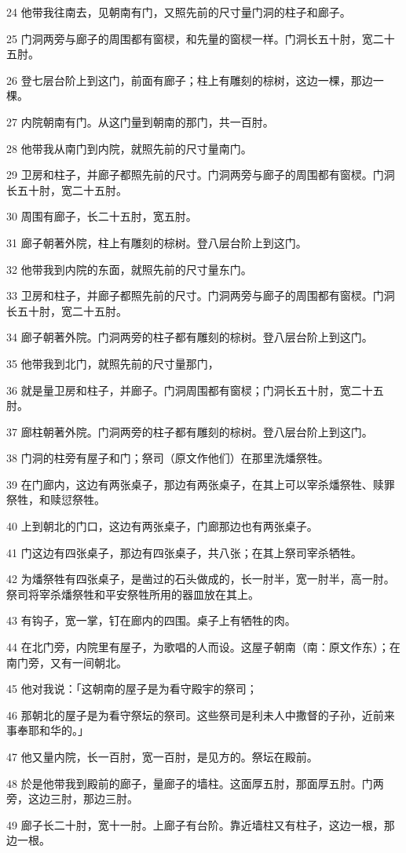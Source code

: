 \par 24 他带我往南去，见朝南有门，又照先前的尺寸量门洞的柱子和廊子。
\par 25 门洞两旁与廊子的周围都有窗棂，和先量的窗棂一样。门洞长五十肘，宽二十五肘。
\par 26 登七层台阶上到这门，前面有廊子；柱上有雕刻的棕树，这边一棵，那边一棵。
\par 27 内院朝南有门。从这门量到朝南的那门，共一百肘。
\par 28 他带我从南门到内院，就照先前的尺寸量南门。
\par 29 卫房和柱子，并廊子都照先前的尺寸。门洞两旁与廊子的周围都有窗棂。门洞长五十肘，宽二十五肘。
\par 30 周围有廊子，长二十五肘，宽五肘。
\par 31 廊子朝著外院，柱上有雕刻的棕树。登八层台阶上到这门。
\par 32 他带我到内院的东面，就照先前的尺寸量东门。
\par 33 卫房和柱子，并廊子都照先前的尺寸。门洞两旁与廊子的周围都有窗棂。门洞长五十肘，宽二十五肘。
\par 34 廊子朝著外院。门洞两旁的柱子都有雕刻的棕树。登八层台阶上到这门。
\par 35 他带我到北门，就照先前的尺寸量那门，
\par 36 就是量卫房和柱子，并廊子。门洞周围都有窗棂；门洞长五十肘，宽二十五肘。
\par 37 廊柱朝著外院。门洞两旁的柱子都有雕刻的棕树。登八层台阶上到这门。
\par 38 门洞的柱旁有屋子和门；祭司（原文作他们）在那里洗燔祭牲。
\par 39 在门廊内，这边有两张桌子，那边有两张桌子，在其上可以宰杀燔祭牲、赎罪祭牲，和赎愆祭牲。
\par 40 上到朝北的门口，这边有两张桌子，门廊那边也有两张桌子。
\par 41 门这边有四张桌子，那边有四张桌子，共八张；在其上祭司宰杀牺牲。
\par 42 为燔祭牲有四张桌子，是凿过的石头做成的，长一肘半，宽一肘半，高一肘。祭司将宰杀燔祭牲和平安祭牲所用的器皿放在其上。
\par 43 有钩子，宽一掌，钉在廊内的四围。桌子上有牺牲的肉。
\par 44 在北门旁，内院里有屋子，为歌唱的人而设。这屋子朝南（南：原文作东）；在南门旁，又有一间朝北。
\par 45 他对我说：「这朝南的屋子是为看守殿宇的祭司；
\par 46 那朝北的屋子是为看守祭坛的祭司。这些祭司是利未人中撒督的子孙，近前来事奉耶和华的。」
\par 47 他又量内院，长一百肘，宽一百肘，是见方的。祭坛在殿前。
\par 48 於是他带我到殿前的廊子，量廊子的墙柱。这面厚五肘，那面厚五肘。门两旁，这边三肘，那边三肘。
\par 49 廊子长二十肘，宽十一肘。上廊子有台阶。靠近墙柱又有柱子，这边一根，那边一根。

